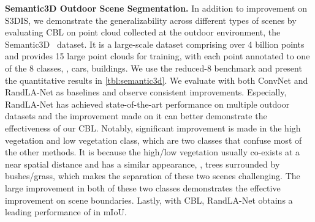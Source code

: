 \documentclass[10pt,twocolumn,letterpaper]{article}
\begin{document}
\noindent\textbf{Semantic3D Outdoor Scene Segmentation.}
In addition to improvement on S3DIS\cite{s3dis}, we demonstrate the generalizability across different types of scenes by evaluating CBL on point cloud collected at the outdoor environment, the Semantic3D~\cite{semantic3d} dataset. It is a large-scale dataset comprising over 4 billion points and provides 15 large point clouds for training, with each point annotated to one of the 8 classes, \eg, cars, buildings.
We use the reduced-8 benchmark and present the quantitative results in \cref{tbl:semantic3d}. We evaluate with both ConvNet and RandLA-Net\cite{randlanet} as baselines and observe consistent improvements. Especially, RandLA-Net has achieved state-of-the-art performance on multiple outdoor datasets and the improvement made on it can better demonstrate the effectiveness of our CBL. Notably, significant improvement is made in the high vegetation and low vegetation class, which are two classes that confuse most of the other methods. It is because the high/low vegetation usually co-exists at a near spatial distance and has a similar appearance, \eg, trees surrounded by bushes/grass, which makes the separation of these two scenes challenging. The large improvement in both of these two classes demonstrates the effective improvement on scene boundaries. Lastly, with CBL, RandLA-Net obtains a leading performance of  in mIoU.
\end{document}
